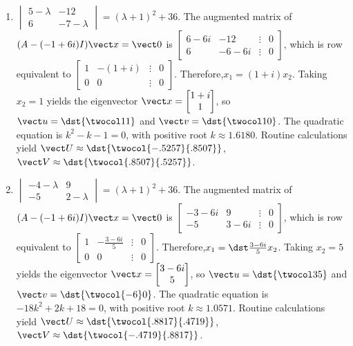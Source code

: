 \documentclass[openany]{book}
\newenvironment{sectionSolutions}{
 \begin{enumerate}[item-label={\thesection.\arabic{enumi}.}]
}{
 \end{enumerate}
}
\begin{document}
\begin{sectionSolutions}
\item
$\begin{vmatrix}5-\lambda&-12\\6&-7-\lambda
\end{vmatrix}=(\lambda+1)^2+36$.
The augmented matrix of $(A-(-1+6i)I){\vect x}={\vect 0}$ is
$\begin{bmatrix}6-6i&-12&\vdots&0\\
6&-6-6i&\vdots&0 \end{bmatrix}$,
which is row equivalent to
$\begin{bmatrix} 1&-(1+i)&\vdots&0\\ 0&0&\vdots&0
\end{bmatrix}$.
Therefore,$x_1=(1+i)x_2$. Taking $x_2=1$
yields the eigenvector
 ${\vect x}=\begin{bmatrix}1+i\\1\end{bmatrix}$,
so ${\vect u}=\dst{\twocol11}$ and ${\vect v}=\dst{\twocol10}$.
The quadratic equation is $k^2-k-1=0$, with positive root
$k\approx1.6180$.
 Routine calculations yield
 ${\vect U}\approx\dst{\twocol{-.5257}{.8507}}$,
${\vect V}\approx\dst{\twocol{.8507}{.5257}}$.


\item
$\begin{vmatrix}-4-\lambda&9\\-5&2-\lambda
\end{vmatrix}=(\lambda+1)^2+36$.
The augmented matrix of $(A-(-1+6i)I){\vect x}={\vect 0}$ is
$\begin{bmatrix}-3-6i&9&\vdots&0\\
-5&3-6i&\vdots&0 \end{bmatrix}$,
which is row equivalent to
$\begin{bmatrix} 1&-\frac{3-6i}{5}&\vdots&0\\ 0&0&\vdots&0
\end{bmatrix}$.
Therefore,$x_1=\dst\frac{3-6i}{5}x_2$. Taking $x_2=5$
yields the eigenvector
 ${\vect x}=\begin{bmatrix}3-6i\\5\end{bmatrix}$,
so ${\vect u}=\dst{\twocol35}$ and ${\vect v}=\dst{\twocol{-6}0}$.
The quadratic equation is $-18k^2+2k+18=0$, with positive root
$k\approx1.0571$.
 Routine calculations yield
 ${\vect U}\approx\dst{\twocol{.8817}{.4719}}$,
${\vect V}\approx\dst{\twocol{-.4719}{.8817}}$.



\end{sectionSolutions}
\end{document}

